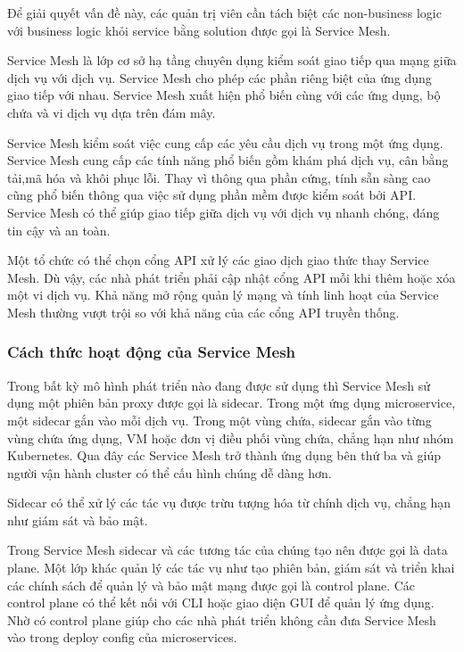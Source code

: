 \documentclass[12pt,a4paper]{report}
\begin{document}
		Để giải quyết vấn đề này, các quản trị viên cần tách biệt các non-business logic với business logic khỏi service bằng solution được gọi là Service Mesh.
		
		Service Mesh là lớp cơ sở hạ tầng chuyên dụng kiểm soát giao tiếp qua mạng giữa dịch vụ với dịch vụ. Service Mesh cho phép các phần riêng biệt của ứng dụng giao tiếp với nhau. Service Mesh xuất hiện phổ biến cùng với các ứng dụng, bộ chứa và vi dịch vụ dựa trên đám mây.
		
		Service Mesh kiểm soát việc cung cấp các yêu cầu dịch vụ trong một ứng dụng. Service Mesh cung cấp các tính năng phổ biến gồm khám phá dịch vụ, cân bằng tải,mã hóa và khôi phục lỗi. Thay vì thông qua phần cứng, tính sẵn sàng cao cũng phổ biến thông qua việc sử dụng phần mềm được kiểm soát bởi API. Service Mesh có thể giúp giao tiếp giữa dịch vụ với dịch vụ nhanh chóng, đáng tin cậy và an toàn.
		
		Một tổ chức có thể chọn cổng API xử lý các giao dịch giao thức thay Service Mesh. Dù vậy, các nhà phát triển phải cập nhật cổng API mỗi khi thêm hoặc xóa một vi dịch vụ. Khả năng mở rộng quản lý mạng và tính linh hoạt của Service Mesh thường vượt trội so với khả năng của các cổng API truyền thống.
		
		\subsubsection{Cách thức hoạt động của Service Mesh}
		\hspace{0.6cm}Trong bất kỳ mô hình phát triển nào đang được sử dụng thì Service Mesh sử dụng một phiên bản proxy được gọi là sidecar. Trong một ứng dụng microservice, một sidecar gắn vào mỗi dịch vụ. Trong một vùng chứa, sidecar gắn vào từng vùng chứa ứng dụng, VM hoặc đơn vị điều phối vùng chứa, chẳng hạn như nhóm Kubernetes. Qua đây các Service Mesh trở thành ứng dụng bên thứ ba và giúp người vận hành cluster có thể cấu hình chúng dễ dàng hơn.
		
		Sidecar có thể xử lý các tác vụ được trừu tượng hóa từ chính dịch vụ, chẳng hạn như giám sát và bảo mật.
		
		Trong Service Mesh sidecar và các tương tác của chúng tạo nên được gọi là data plane. Một lớp khác quản lý các tác vụ như tạo phiên bản, giám sát và triển khai các chính sách để quản lý và bảo mật mạng được gọi là control plane. Các control plane có thể kết nối với CLI hoặc giao diện GUI để quản lý ứng dụng. Nhờ có control plane giúp cho các nhà phát triển không cần đưa Service Mesh vào trong deploy config của microservices.
		
\end{document}
